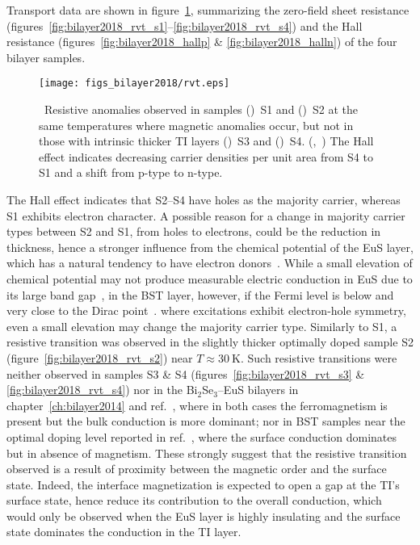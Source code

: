Transport data are shown in figure~\ref{fig:bilayer2018_rvt}, summarizing the zero-field sheet resistance (figures~\ref{fig:bilayer2018_rvt_s1}--\ref{fig:bilayer2018_rvt_s4}) and the Hall resistance (figures~\ref{fig:bilayer2018_hallp} \& \ref{fig:bilayer2018_halln}) of the four bilayer samples. %
\begin{figure}[ht]%
    \centering%
    \texttt{[image: figs\_bilayer2018/rvt.eps]}%
    \subfloat{\label{fig:bilayer2018_rvt_s1}}%
    \subfloat{\label{fig:bilayer2018_rvt_s2}}%
    \subfloat{\label{fig:bilayer2018_rvt_s3}}%
    \subfloat{\label{fig:bilayer2018_rvt_s4}}%
    \subfloat{\label{fig:bilayer2018_hallp}}%
    \subfloat{\label{fig:bilayer2018_halln}}%
    \caption[Temperature dependence of resistance, and the Hall effect, in (Bi$_{x}$Sb$_{1-x}$)$_2$Te$_3$--EuS bilayers]{\label{fig:bilayer2018_rvt}~Resistive anomalies observed in samples (\protect{})~S1 and (\protect{})~S2 at the same temperatures where magnetic anomalies occur, but not in those with intrinsic thicker TI layers (\protect{})~S3 and (\protect{})~S4. (\protect{},~\protect{}) The Hall effect indicates decreasing carrier densities per unit area from S4 to S1 and a shift from p-type to n-type.}%
\end{figure}%
The Hall effect indicates that S2--S4 have holes as the majority carrier, whereas S1 exhibits electron character. A possible reason for a change in majority carrier types between S2 and S1, from holes to electrons, could be the reduction in thickness, hence a stronger influence from the chemical potential of the EuS layer, which has a natural tendency to have electron donors~\cite{EuS_ntype}. While a small elevation of chemical potential may not produce measurable electric conduction in EuS due to its large band gap~\cite{EuS_band_th1, EuS_band_th2}, in the BST layer, however, if the Fermi level is below and very close to the Dirac point~\cite{ZhangJS2011}. where excitations exhibit electron-hole symmetry, even a small elevation may change the majority carrier type. Similarly to S1, a resistive transition was observed in the slightly thicker optimally doped sample S2 (figure~\ref{fig:bilayer2018_rvt_s2}) near $T\approx30~\mathrm{K}$. Such resistive transitions were neither observed in samples S3 \& S4 (figures~\ref{fig:bilayer2018_rvt_s3} \& \ref{fig:bilayer2018_rvt_s4}) nor in the Bi$_2$Se$_3$--EuS bilayers in chapter~\ref{ch:bilayer2014} and ref.~\cite{bilayer2014}, where in both cases the ferromagnetism is present but the bulk conduction is more dominant; nor in BST samples near the optimal doping level reported in ref.~\cite{ZhangJS2011}, where the surface conduction dominates but in absence of magnetism. These strongly suggest that the resistive transition observed is a result of proximity between the magnetic order and the surface state. Indeed, the interface magnetization is expected to open a gap at the TI's surface state, hence reduce its contribution to the overall conduction, which would only be observed when the EuS layer is highly insulating and the surface state dominates the conduction in the TI layer.

